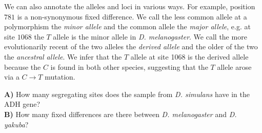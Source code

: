 We can also annotate the alleles and loci in various ways. For example, position
$781$ is a non-synonymous fixed difference. We call the less common
allele at a polymorphism the  \emph{minor allele} and the common
allele the \emph{major allele}, e.g. at site $1068$ the $T$ allele is the
minor allele in {\it D. melanogaster}. We call the more evolutionarily
recent of the two alleles the \emph{derived allele} and the older of
the two the \emph{ancestral allele}. We infer that the $T$ allele at site 1068 is
the derived allele because the $C$ is found in both other species,
suggesting that the $T$ allele arose via a $C \rightarrow T$ mutation.


\begin{table}
  \tiny
\setlength{\tabcolsep}{.45\tabcolsep}   %
  \caption{Variable sites in exons 2 and 3 of the ADH gene in {\it Drosophila} \citet{mcdonald:91}.
The first column (pos.) gives the position in the gene; exon 2 begins at
position $778$ and we've truncated the dataset at site $1175$.
The second column gives the consensus nucleotide (con.), i.e. the most
common base at that position; individuals with nucleotides that match
the consensus are marked with a dash.  The first columns of sequence
(a-l) are from {\it D. melanogaster};
    the next columns (a-f) give sequences from \textit{D. simulans}, and the final
 set of columns (a-l ) from {\it D. yakuba}. The last column shows
 whether the difference is a non-synonymous (N) or synonymous (S) change. }  %
  \label{Table:ADH}
\end{table}

\begin{question}
{\bf A)} How many segregating sites does the sample from \textit{
  D. simulans} have in the ADH gene?\\
{\bf B)} How many fixed differences are there between \textit{D. melanogaster} and \textit{D. yakuba}?
\end{question}

